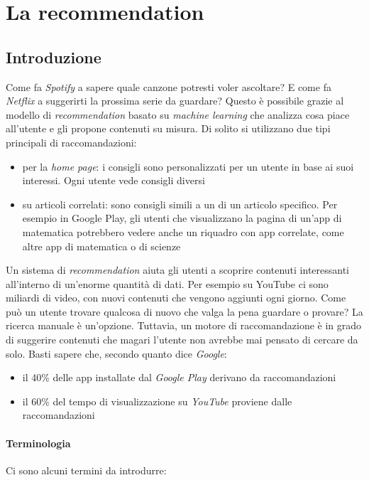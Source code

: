 \chapter{La recommendation}

\section{Introduzione}

Come fa \textit{Spotify} a sapere quale canzone potresti voler ascoltare? E come fa \textit{Netflix} a suggerirti la prossima serie da guardare? Questo è possibile grazie al modello di \textit{recommendation} basato su \textit{machine learning} che analizza cosa piace all'utente e gli propone contenuti su misura. Di solito si utilizzano due tipi principali di raccomandazioni:

\begin{itemize}
    \item per la \textit{home page}: i consigli sono personalizzati per un utente in base ai suoi interessi. Ogni utente vede consigli diversi
    \item su articoli correlati: sono consigli simili a un di un articolo specifico. Per esempio in Google Play, gli utenti che visualizzano la pagina di un'app di matematica potrebbero vedere anche un riquadro con app correlate, come altre app di matematica o di scienze
\end{itemize}

Un sistema di \textit{recommendation} aiuta gli utenti a scoprire contenuti interessanti all'interno di un'enorme quantità di dati. Per esempio su YouTube ci sono miliardi di video, con nuovi contenuti che vengono aggiunti ogni giorno. Come può un utente trovare qualcosa di nuovo che valga la pena guardare o provare? La ricerca manuale è un'opzione. Tuttavia, un motore di raccomandazione è in grado di suggerire contenuti che magari l'utente non avrebbe mai pensato di cercare da solo. Basti sapere che, secondo quanto dice \textit{Google}:

\begin{itemize}
    \item il 40\% delle app installate dal \textit{Google Play} derivano da raccomandazioni
    \item il 60\% del tempo di visualizzazione su \textit{YouTube} proviene dalle raccomandazioni
\end{itemize}


\subsubsection{Terminologia}
Ci sono alcuni termini da introdurre:

